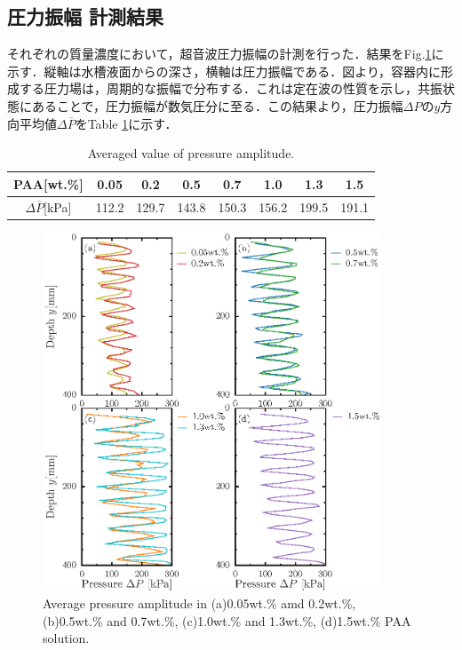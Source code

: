 \clearpage

\subsection{圧力振幅 計測結果}

それぞれの質量濃度において，超音波圧力振幅の計測を行った．結果をFig.\ref{fig:pressure}に示す．縦軸は水槽液面からの深さ，横軸は圧力振幅である．図より，容器内に形成する圧力場は，周期的な振幅で分布する．これは定在波の性質を示し，共振状態にあることで，圧力振幅が数気圧分に至る．この結果より，圧力振幅$\Delta{}P$の$y$方向平均値$\Delta\overline{P}$をTable \ref{table:press}に示す．

\begin{table}[h]
	\centering
	\caption{Averaged value of pressure amplitude.}
	\label{table:press}
	\begin{tabular}{c|c|c|c|c|c|c|c} \hline
		PAA[wt.\%]                & 0.05  & 0.2   & 0.5   & 0.7   & 1.0   & 1.3   & 1.5   \\ \hline \hline
		$\Delta\overline{P}$[kPa] & 112.2 & 129.7 & 143.8 & 150.3 & 156.2 & 199.5 & 191.1 \\ \hline
	\end{tabular}
\end{table}

\begin{figure}[ht]
	\centering
	\includegraphics[width=0.9\textwidth]{3-Physical_Property/press.eps}
	\caption{Average pressure amplitude in (a)0.05wt.\% amd 0.2wt.\%, (b)0.5wt.\% and 0.7wt.\%, (c)1.0wt.\% and 1.3wt.\%, (d)1.5wt.\% PAA solution.}
	\label{fig:pressure}
\end{figure}
